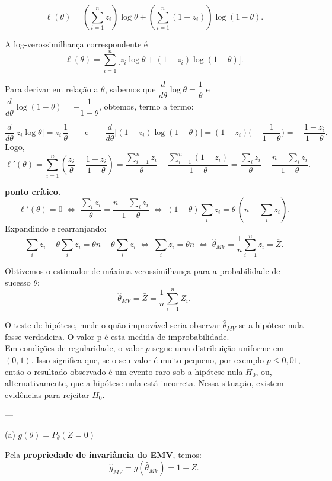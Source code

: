 
\[
\ell(\theta)
= \left(\sum_{i=1}^{n} z_i\right)\log \theta
+ \left(\sum_{i=1}^{n}(1-z_i)\right)\log(1-\theta).
\]

A log-verossimilhança correspondente é
\[
\boxed{\ell(\theta) 
= \sum_{i=1}^n \big[z_i \log\theta + (1-z_i)\log(1-\theta)\big].}
\]

Para derivar em relação a \(\theta\), sabemos que 
\(\dfrac{d}{d\theta}\log\theta=\dfrac1\theta\) e 
\(\dfrac{d}{d\theta}\log(1-\theta)= -\dfrac1{1-\theta}\), obtemos,
termo a termo:

\[
\frac{d}{d\theta}\Big[z_i\log\theta\Big]
= z_i\,\frac1\theta
\qquad\text{e}\qquad
\frac{d}{d\theta}\Big[(1-z_i)\log(1-\theta)\Big]
= (1-z_i)\Big(-\frac1{1-\theta}\Big)
= -\,\frac{1-z_i}{1-\theta}.
\]
Logo,
\[
\ell'(\theta)
=\sum_{i=1}^n\left(\frac{z_i}{\theta}-\frac{1-z_i}{1-\theta}\right)
= \frac{\sum_{i=1}^n z_i}{\theta} - \frac{\sum_{i=1}^n(1-z_i)}{1-\theta}
= \frac{\sum_i z_i}{\theta} - \frac{n-\sum_i z_i}{1-\theta}.
\]

 \textbf{ponto crítico.}
\[
\ell'(\theta)=0
\;\Longleftrightarrow\;
\frac{\sum_i z_i}{\theta}
= \frac{n-\sum_i z_i}{1-\theta}
\;\Longleftrightarrow\;
(1-\theta)\sum_i z_i=\theta\,(n-\sum_i z_i).
\]
Expandindo e rearranjando:
\[
\sum_i z_i - \theta\sum_i z_i = \theta n - \theta\sum_i z_i
\;\Longleftrightarrow\;
\sum_i z_i = \theta n
\;\Longleftrightarrow\;
\widehat\theta_{MV}=\frac1n\sum_{i=1}^n z_i=\overline Z.
\]


Obtivemos o estimador de máxima verossimilhança para a probabilidade de sucesso \(\theta\):
\[
\boxed{\hat{\theta}_{MV} = \bar{Z} = \frac{1}{n}\sum_{i=1}^n Z_i.}
\]

O teste de hipótese, mede o quão improvável seria observar $\hat{\theta}_{MV}$ se a hipótese nula fosse verdadeira. O valor-p é esta medida de improbabilidade.
\\[1em]
Em condições de regularidade, o valor-$p$ segue uma distribuição uniforme em $(0,1)$.
Isso significa que, se o seu valor é muito pequeno, por exemplo $p \leq 0{,}01$,
então o resultado observado é um evento raro sob a hipótese nula $H_0$,
ou, alternativamente, que a hipótese nula está incorreta.
Nessa situação, existem evidências para rejeitar $H_0$.


---

(a) \( g(\theta) = P_\theta(Z=0) \)

Pela \textbf{propriedade de invariância do EMV}, temos:
\[
\boxed{\hat{g}_{MV} = g(\hat{\theta}_{MV}) = 1 - \bar{Z}.}
\]

